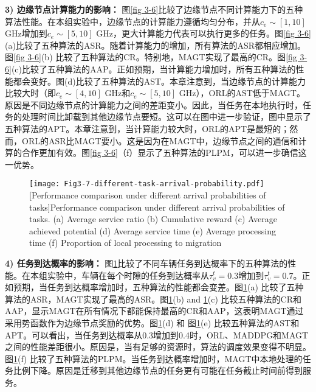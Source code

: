\textbf{3) 边缘节点计算能力的影响：} 图\ref{fig 3-6}比较了边缘节点不同计算能力下的五种算法性能。在本组实验中，边缘节点的计算能力遵循均匀分布，并从$c_e\sim[1, 10]$ GHz增加到$c_e\sim[5, 10]$ GHz，更大计算能力代表可以执行更多的任务。图\ref{fig 3-6}(a)比较了五种算法的ASR。随着计算能力的增加，所有算法的ASR都相应增加。图\ref{fig 3-6}(b) 比较了五种算法的CR。特别地，MAGT实现了最高的CR。图\ref{fig 3-6}(c)比较了五种算法的AAP。正如预期，当计算能力增加时，所有五种算法的性能都会变好。图(d)比较了五种算法的AST。本章注意到，当边缘节点的计算能力比较大时（即$c_e\sim[4,10]$ GHz和$c_e\sim[5,10]$ GHz），ORL的AST低于MAGT。原因是不同边缘节点的计算能力之间的差距变小。因此，当任务在本地执行时，任务的处理时间比卸载到其他边缘节点要短。这可以在图中进一步验证，图中显示了五种算法的APT。本章注意到，当计算能力较大时，ORL的APT是最短的；然而，ORL的ASR比MAGT要小。这是因为在MAGT中，边缘节点之间的通信和计算的合作更加有效。图\ref{fig 3-6}（f）显示了五种算法的PLPM，可以进一步确信这一优势。

\begin{figure}[h]
\centering
  \texttt{[image: Fig3-7-different-task-arrival-probability.pdf]}
  [Performance comparison under different arrival probabilities of tasks]{Performance comparison under different arrival probabilities of tasks. (a) Average service ratio (b) Cumulative reward (c) Average achieved potential (d) Average service time (e) Average processing time (f) Proportion of local processing to migration}
  \label{fig 3-7}
\end{figure} 

\textbf{4) 任务到达概率的影响：} 图\ref{fig 3-7}比较了不同车辆任务到达概率下的五种算法的性能。在本组实验中，车辆在每个时隙的任务到达概率从$\tau_{v}^{t}=0.3$增加到$\tau_{v}^{t}=0.7$。正如预期，当任务到达概率增加时，五种算法的性能都会变差。图\ref{fig 3-7}(a) 比较了五种算法的ASR，MAGT实现了最高的ASR。图\ref{fig 3-7}(b) and \ref{fig 3-7}(c) 比较五种算法的CR和AAP，显示MAGT在所有情况下都能保持最高的CR和AAP，这表明MAGT通过采用势函数作为边缘节点奖励的优势。图\ref{fig 3-7}(d) 和 图\ref{fig 3-7}(e) 比较五种算法的AST和APT。可以看出，当任务到达概率从0.3增加到0.4时，ORL、MADDPG和MAGT之间的性能差距很小。原因是，当有足够的资源时，算法的调度效果变得不明显。图\ref{fig 3-7}(f) 比较了五种算法的PLPM。当任务到达概率增加时，MAGT中本地处理的任务比例下降。原因是迁移到其他边缘节点的任务更有可能在任务截止时间前得到服务。

